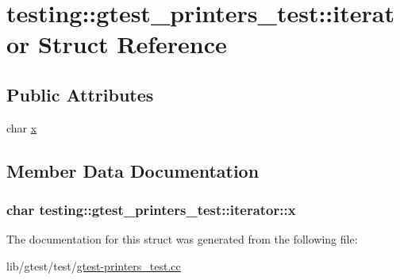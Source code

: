 \hypertarget{structtesting_1_1gtest__printers__test_1_1iterator}{\section{testing\-:\-:gtest\-\_\-printers\-\_\-test\-:\-:iterator Struct Reference}
\label{structtesting_1_1gtest__printers__test_1_1iterator}
}
\subsection*{Public Attributes}
\begin{DoxyCompactItemize}
\item 
char \hyperlink{structtesting_1_1gtest__printers__test_1_1iterator_a3d4d056077d3b3869259bdfd60a0778f}{x}
\end{DoxyCompactItemize}


\subsection{Member Data Documentation}
\hypertarget{structtesting_1_1gtest__printers__test_1_1iterator_a3d4d056077d3b3869259bdfd60a0778f}{
\subsubsection[{x}]{\setlength{\rightskip}{0pt plus 5cm}char testing\-::gtest\-\_\-printers\-\_\-test\-::iterator\-::x}}\label{structtesting_1_1gtest__printers__test_1_1iterator_a3d4d056077d3b3869259bdfd60a0778f}


The documentation for this struct was generated from the following file\-:\begin{DoxyCompactItemize}
\item 
lib/gtest/test/\hyperlink{gtest-printers__test_8cc}{gtest-\/printers\-\_\-test.\-cc}\end{DoxyCompactItemize}
